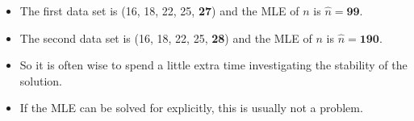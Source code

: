 \documentclass{article}
\begin{document}
\begin{itemize}
\begin{itemize}
        \item[] The first data set is (16, 18, 22, 25, \textbf{27}) and the MLE of $n$ is $\hat{n} = \textbf{99}$.
        \item[] The second data set is (16, 18, 22, 25, \textbf{28}) and the MLE of $n$ is $\hat{n} = \textbf{190}$.
        \item So it is often wise to spend a little extra time investigating the stability of the solution.
        \item If the MLE can be solved for explicitly, this is usually not a problem.
    \end{itemize}
\end{itemize}
\end{document}

